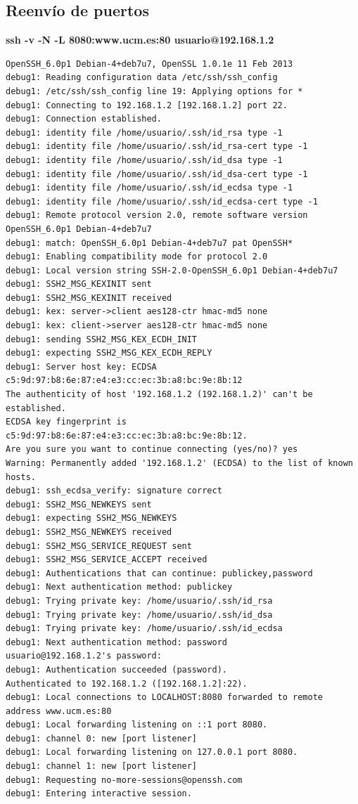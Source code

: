 \documentclass[11pt]{article}
\begin{document}
    \subsection{Reenvío de puertos}
      \par
      \textbf{ssh -v -N -L 8080:www.ucm.es:80 usuario@192.168.1.2}

\begin{lstlisting}
OpenSSH_6.0p1 Debian-4+deb7u7, OpenSSL 1.0.1e 11 Feb 2013
debug1: Reading configuration data /etc/ssh/ssh_config
debug1: /etc/ssh/ssh_config line 19: Applying options for *
debug1: Connecting to 192.168.1.2 [192.168.1.2] port 22.
debug1: Connection established.
debug1: identity file /home/usuario/.ssh/id_rsa type -1
debug1: identity file /home/usuario/.ssh/id_rsa-cert type -1
debug1: identity file /home/usuario/.ssh/id_dsa type -1
debug1: identity file /home/usuario/.ssh/id_dsa-cert type -1
debug1: identity file /home/usuario/.ssh/id_ecdsa type -1
debug1: identity file /home/usuario/.ssh/id_ecdsa-cert type -1
debug1: Remote protocol version 2.0, remote software version OpenSSH_6.0p1 Debian-4+deb7u7
debug1: match: OpenSSH_6.0p1 Debian-4+deb7u7 pat OpenSSH*
debug1: Enabling compatibility mode for protocol 2.0
debug1: Local version string SSH-2.0-OpenSSH_6.0p1 Debian-4+deb7u7
debug1: SSH2_MSG_KEXINIT sent
debug1: SSH2_MSG_KEXINIT received
debug1: kex: server->client aes128-ctr hmac-md5 none
debug1: kex: client->server aes128-ctr hmac-md5 none
debug1: sending SSH2_MSG_KEX_ECDH_INIT
debug1: expecting SSH2_MSG_KEX_ECDH_REPLY
debug1: Server host key: ECDSA c5:9d:97:b8:6e:87:e4:e3:cc:ec:3b:a8:bc:9e:8b:12
The authenticity of host '192.168.1.2 (192.168.1.2)' can't be established.
ECDSA key fingerprint is c5:9d:97:b8:6e:87:e4:e3:cc:ec:3b:a8:bc:9e:8b:12.
Are you sure you want to continue connecting (yes/no)? yes
Warning: Permanently added '192.168.1.2' (ECDSA) to the list of known hosts.
debug1: ssh_ecdsa_verify: signature correct
debug1: SSH2_MSG_NEWKEYS sent
debug1: expecting SSH2_MSG_NEWKEYS
debug1: SSH2_MSG_NEWKEYS received
debug1: SSH2_MSG_SERVICE_REQUEST sent
debug1: SSH2_MSG_SERVICE_ACCEPT received
debug1: Authentications that can continue: publickey,password
debug1: Next authentication method: publickey
debug1: Trying private key: /home/usuario/.ssh/id_rsa
debug1: Trying private key: /home/usuario/.ssh/id_dsa
debug1: Trying private key: /home/usuario/.ssh/id_ecdsa
debug1: Next authentication method: password
usuario@192.168.1.2's password:
debug1: Authentication succeeded (password).
Authenticated to 192.168.1.2 ([192.168.1.2]:22).
debug1: Local connections to LOCALHOST:8080 forwarded to remote address www.ucm.es:80
debug1: Local forwarding listening on ::1 port 8080.
debug1: channel 0: new [port listener]
debug1: Local forwarding listening on 127.0.0.1 port 8080.
debug1: channel 1: new [port listener]
debug1: Requesting no-more-sessions@openssh.com
debug1: Entering interactive session.
\end{lstlisting}
\end{document}
